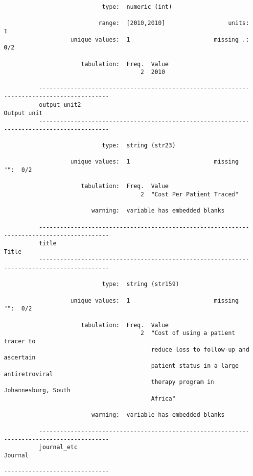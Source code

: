 \documentclass{article}
\begin{document}
\begin{verbatim}
                            type:  numeric (int)
          
                           range:  [2010,2010]                  units:  1
                   unique values:  1                        missing .:  0/2
          
                      tabulation:  Freq.  Value
                                       2  2010
          
          ------------------------------------------------------------------------------------------
          output_unit2                                                                   Output unit
          ------------------------------------------------------------------------------------------
          
                            type:  string (str23)
          
                   unique values:  1                        missing "":  0/2
          
                      tabulation:  Freq.  Value
                                       2  "Cost Per Patient Traced"
          
                         warning:  variable has embedded blanks
          
          ------------------------------------------------------------------------------------------
          title                                                                                Title
          ------------------------------------------------------------------------------------------
          
                            type:  string (str159)
          
                   unique values:  1                        missing "":  0/2
          
                      tabulation:  Freq.  Value
                                       2  "Cost of using a patient tracer to
                                          reduce loss to follow-up and ascertain
                                          patient status in a large antiretroviral
                                          therapy program in Johannesburg, South
                                          Africa"
          
                         warning:  variable has embedded blanks
          
          ------------------------------------------------------------------------------------------
          journal_etc                                                                        Journal
          ------------------------------------------------------------------------------------------
          

\end{verbatim}
\end{document}

